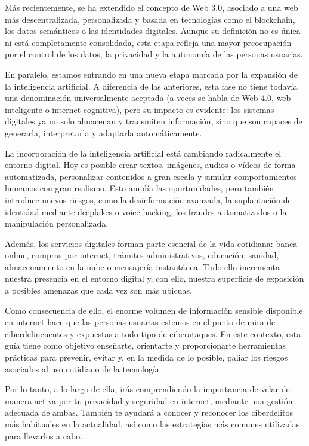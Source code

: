 \documentclass[
  spanish,
  a4paper,
  openany]{book}
\begin{document}
Más recientemente, se ha extendido el concepto de Web 3.0, asociado a una web más descentralizada, personalizada y basada en tecnologías como el blockchain, los datos semánticos o las identidades digitales. Aunque su definición no es única ni está completamente consolidada, esta etapa refleja una mayor preocupación por el control de los datos, la privacidad y la autonomía de las personas usuarias.

En paralelo, estamos entrando en una nueva etapa marcada por la expansión de la inteligencia artificial. A diferencia de las anteriores, esta fase no tiene todavía una denominación universalmente aceptada (a veces se habla de Web 4.0, web inteligente o internet cognitiva), pero su impacto es evidente: los sistemas digitales ya no solo almacenan y transmiten información, sino que son capaces de generarla, interpretarla y adaptarla automáticamente.

La incorporación de la inteligencia artificial está cambiando radicalmente el entorno digital. Hoy es posible crear textos, imágenes, audios o vídeos de forma automatizada, personalizar contenidos a gran escala y simular comportamientos humanos con gran realismo. Esto amplía las oportunidades, pero también introduce nuevos riesgos, como la desinformación avanzada, la suplantación de identidad mediante deepfakes o voice hacking, los fraudes automatizados o la manipulación personalizada.

Además, los servicios digitales forman parte esencial de la vida cotidiana: banca online, compras por internet, trámites administrativos, educación, sanidad, almacenamiento en la nube o mensajería instantánea. Todo ello incrementa nuestra presencia en el entorno digital y, con ello, nuestra superficie de exposición a posibles amenazas que cada vez son más ubicuas.

Como consecuencia de ello, el enorme volumen de información sensible disponible en internet hace que las personas usuarias estemos en el punto de mira de ciberdelincuentes y expuestas a todo tipo de ciberataques. En este contexto, esta guía tiene como objetivo enseñarte, orientarte y proporcionarte herramientas prácticas para prevenir, evitar y, en la medida de lo posible, paliar los riesgos asociados al uso cotidiano de la tecnología.

Por lo tanto, a lo largo de ella, irás comprendiendo la importancia de velar de manera activa por tu privacidad y seguridad en internet, mediante una gestión adecuada de ambas. También te ayudará a conocer y reconocer los ciberdelitos más habituales en la actualidad, así como las estrategias más comunes utilizadas para llevarlos a cabo.
\end{document}
